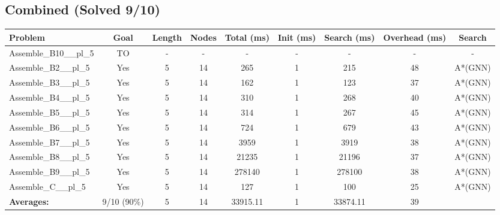 \documentclass{article}
\begin{document}
\subsection*{Combined (Solved 9/10)}
\begin{tabular}{lcccccccc}
\toprule
Problem & Goal & Length & Nodes & Total (ms) & Init (ms) & Search (ms) & Overhead (ms) & Search \\
\midrule
Assemble\_B10\_\_pl\_5 & TO & - & - & - & - & - & - & - \\
Assemble\_B2\_\_pl\_5 & Yes & 5 & 14 & 265 & 1 & 215 & 48 & A*(GNN) \\
Assemble\_B3\_\_pl\_5 & Yes & 5 & 14 & 162 & 1 & 123 & 37 & A*(GNN) \\
Assemble\_B4\_\_pl\_5 & Yes & 5 & 14 & 310 & 1 & 268 & 40 & A*(GNN) \\
Assemble\_B5\_\_pl\_5 & Yes & 5 & 14 & 314 & 1 & 267 & 45 & A*(GNN) \\
Assemble\_B6\_\_pl\_5 & Yes & 5 & 14 & 724 & 1 & 679 & 43 & A*(GNN) \\
Assemble\_B7\_\_pl\_5 & Yes & 5 & 14 & 3959 & 1 & 3919 & 38 & A*(GNN) \\
Assemble\_B8\_\_pl\_5 & Yes & 5 & 14 & 21235 & 1 & 21196 & 37 & A*(GNN) \\
Assemble\_B9\_\_pl\_5 & Yes & 5 & 14 & 278140 & 1 & 278100 & 38 & A*(GNN) \\
Assemble\_C\_\_pl\_5 & Yes & 5 & 14 & 127 & 1 & 100 & 25 & A*(GNN) \\
\textbf{Averages:} & 9/10 (90\%) & 5 & 14 & 33915.11 & 1 & 33874.11 & 39 & \\
\bottomrule
\end{tabular}
\\[0.7cm]
\end{document}
